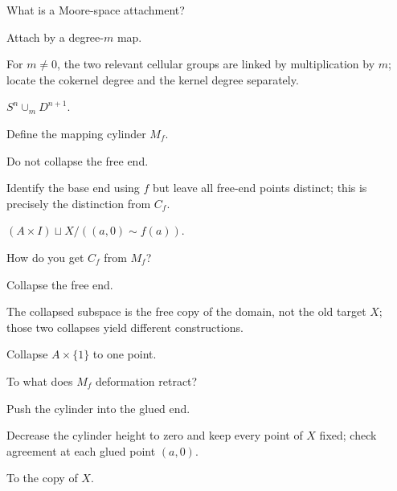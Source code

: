 \begin{exercise}\label{exr:viii07-15}
What is a Moore-space attachment?
\end{exercise}
\begin{hint}
Attach by a degree-\(m\) map.

For \(m\ne0\), the two relevant cellular groups are linked by multiplication by \(m\); locate the cokernel degree and the kernel degree separately.
\end{hint}
\begin{solution}
\(S^n\cup_mD^{n+1}\).
\end{solution}

\begin{exercise}\label{exr:viii07-16}
Define the mapping cylinder \(M_f\).
\end{exercise}
\begin{hint}
Do not collapse the free end.

Identify the base end using \(f\) but leave all free-end points distinct; this is precisely the distinction from \(C_f\).
\end{hint}
\begin{solution}
\((A\times I)\sqcup X/((a,0)\sim f(a))\).
\end{solution}

\begin{exercise}\label{exr:viii07-17}
How do you get \(C_f\) from \(M_f\)?
\end{exercise}
\begin{hint}
Collapse the free end.

The collapsed subspace is the free copy of the domain, not the old target \(X\); those two collapses yield different constructions.
\end{hint}
\begin{solution}
Collapse \(A\times\{1\}\) to one point.
\end{solution}

\begin{exercise}\label{exr:viii07-18}
To what does \(M_f\) deformation retract?
\end{exercise}
\begin{hint}
Push the cylinder into the glued end.

Decrease the cylinder height to zero and keep every point of \(X\) fixed; check agreement at each glued point \((a,0)\).
\end{hint}
\begin{solution}
To the copy of \(X\).
\end{solution}

